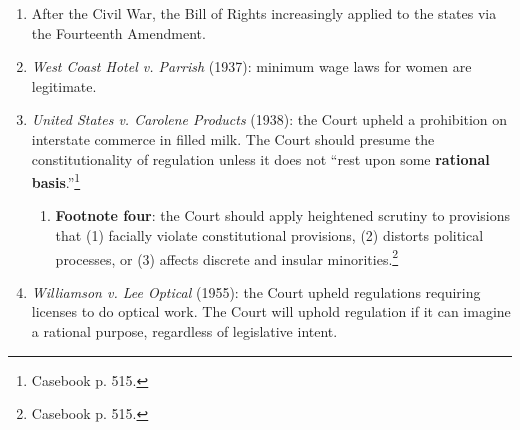\begin{enumerate}
    \item After the Civil War, the Bill of Rights increasingly applied to the 
    states via the Fourteenth Amendment.
    \item \emph{West Coast Hotel v. Parrish} (1937): minimum wage laws for 
    women are legitimate. %
    \item \emph{United States v. Carolene Products} (1938): the Court upheld a 
    prohibition on interstate commerce in filled milk. The Court should 
    presume the constitutionality of regulation unless it does not ``rest upon 
    some \textbf{rational basis}.''\footnote{Casebook p. 515.} 
    \begin{enumerate}
        \item \textbf{Footnote four}: the Court should apply heightened 
        scrutiny to provisions that (1) facially violate constitutional 
        provisions, (2) distorts political processes, or (3) affects discrete 
        and insular minorities.\footnote{Casebook p. 515.}
    \end{enumerate}
    \item \emph{Williamson v. Lee Optical} (1955): the Court upheld 
    regulations requiring licenses to do optical work. The Court will uphold 
    regulation if it can imagine a rational purpose, regardless of legislative 
    intent.
\end{enumerate}
